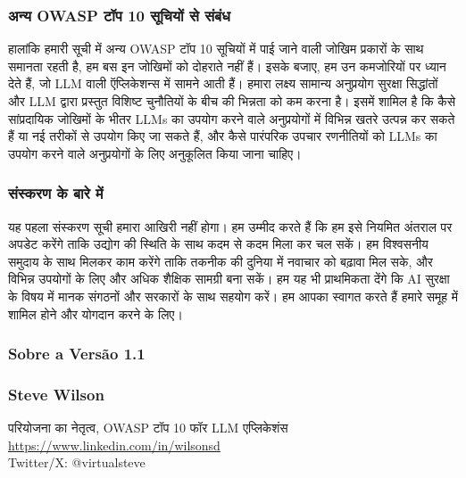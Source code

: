 \documentclass[
]{article}
\begin{document}
\subsubsection{अन्य OWASP टॉप 10 सूचियों से
संबंध}\label{ux905ux928ux92f-owasp-ux91fux92a-10-ux938ux91aux92f-ux938-ux938ux92cux927}

हालांकि हमारी सूची में अन्य OWASP टॉप 10 सूचियों में पाई जाने वाली जोखिम प्रकारों के
साथ समानता रहती है, हम बस इन जोखिमों को दोहराते नहीं हैं। इसके बजाए, हम उन
कमजोरियों पर ध्यान देते हैं, जो LLM वाली ऍप्लिकेशन्स में सामने आती हैं। हमारा लक्ष्य
सामान्य अनुप्रयोग सुरक्षा सिद्धांतों और LLM द्वारा प्रस्तुत विशिष्ट चुनौतियों के बीच की
भिन्नता को कम करना है। इसमें शामिल है कि कैसे सांप्रदायिक जोखिमों के भीतर LLMs का
उपयोग करने वाले अनुप्रयोगों में विभिन्न खतरे उत्पन्न कर सकते हैं या नई तरीकों से उपयोग
किए जा सकते हैं, और कैसे पारंपरिक उपचार रणनीतियों को LLMs का उपयोग करने वाले
अनुप्रयोगों के लिए अनुकूलित किया जाना चाहिए।

\subsubsection{संस्करण के बारे
में}\label{ux938ux938ux915ux930ux923-ux915-ux92cux930-ux92e}

यह पहला संस्करण सूची हमारा आखिरी नहीं होगा। हम उम्मीद करते हैं कि हम इसे नियमित
अंतराल पर अपडेट करेंगे ताकि उद्योग की स्थिति के साथ कदम से कदम मिला कर चल सकें। हम
विश्वसनीय समुदाय के साथ मिलकर काम करेंगे ताकि तकनीक की दुनिया में नवाचार को बढ़ावा
मिल सके, और विभिन्न उपयोगों के लिए और अधिक शैक्षिक सामग्री बना सकें। हम यह भी
प्राथमिकता देंगे कि AI सुरक्षा के विषय में मानक संगठनों और सरकारों के साथ सहयोग करें।
हम आपका स्वागत करते हैं हमारे समूह में शामिल होने और योगदान करने के लिए।

\subsubsection{Sobre a Versão 1.1}\label{sobre-a-versuxe3o-1.1}

\subsubsection{Steve Wilson}\label{steve-wilson}

परियोजना का नेतृत्व, OWASP टॉप 10 फॉर LLM एप्लिकेशंस\\
\href{https://www.linkedin.com/in/wilsonsd/}{https://www.linkedin.com/in/wilsonsd}\\
Twitter/X: @virtualsteve
\end{document}
